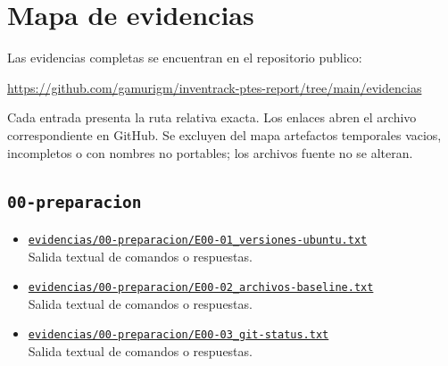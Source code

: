\chapter{Mapa de evidencias}

Las evidencias completas se encuentran en el repositorio publico:

\begin{center}
\href{https://github.com/gamurigm/inventrack-ptes-report/tree/main/evidencias}{https://github.com/gamurigm/inventrack-ptes-report/tree/main/evidencias}
\end{center}

Cada entrada presenta la ruta relativa exacta. Los enlaces abren el archivo correspondiente en GitHub. Se excluyen del mapa artefactos temporales vacios, incompletos o con nombres no portables; los archivos fuente no se alteran.

\section{\texorpdfstring{\nolinkurl{00-preparacion}}{00-preparacion}}
\begin{itemize}[leftmargin=1.2em]
  \item \href{https://github.com/gamurigm/inventrack-ptes-report/blob/main/evidencias/00-preparacion/E00-01_versiones-ubuntu.txt}{\nolinkurl{evidencias/00-preparacion/E00-01_versiones-ubuntu.txt}}\\
  {\small Salida textual de comandos o respuestas.}
  \item \href{https://github.com/gamurigm/inventrack-ptes-report/blob/main/evidencias/00-preparacion/E00-02_archivos-baseline.txt}{\nolinkurl{evidencias/00-preparacion/E00-02_archivos-baseline.txt}}\\
  {\small Salida textual de comandos o respuestas.}
  \item \href{https://github.com/gamurigm/inventrack-ptes-report/blob/main/evidencias/00-preparacion/E00-03_git-status.txt}{\nolinkurl{evidencias/00-preparacion/E00-03_git-status.txt}}\\
  {\small Salida textual de comandos o respuestas.}
\end{itemize}


